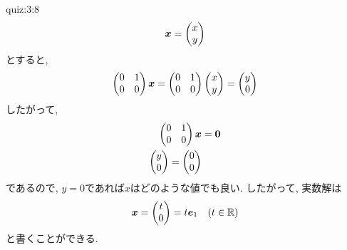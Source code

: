 \begin{answerof}{quiz:3:8} 
  \begin{align*}
    \boldsymbol{x}=
    \begin{pmatrix}x\\y\end{pmatrix}
  \end{align*}
  とすると,
  \begin{align*}
     \begin{pmatrix}0&1\\0&0\end{pmatrix}
      \boldsymbol{x}=
      \begin{pmatrix}0&1\\0&0\end{pmatrix}
        \begin{pmatrix}x\\y\end{pmatrix}
      = \begin{pmatrix}y\\0\end{pmatrix}  
  \end{align*}
  したがって,
  \begin{align*}
     \begin{pmatrix}0&1\\0&0\end{pmatrix}
      \boldsymbol{x}&=\boldsymbol{0}\\
     \begin{pmatrix}y\\0\end{pmatrix}=\begin{pmatrix}0\\0\end{pmatrix}  
  \end{align*}
  であるので, $y=0$であれば$x$はどのような値でも良い.
  したがって,
  実数解は
  \begin{align*}
    \boldsymbol{x}=\begin{pmatrix}t\\0\end{pmatrix}=t\boldsymbol{e}_1&&(t\in\mathbb{R})
  \end{align*}
  と書くことができる.
\end{answerof}

